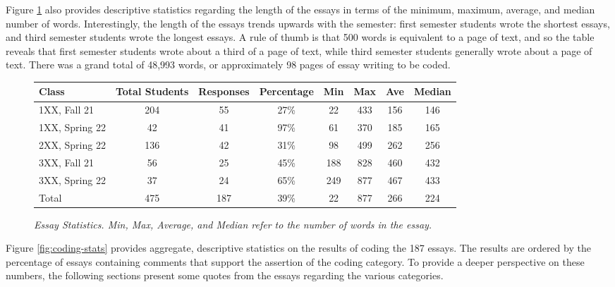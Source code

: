 \documentclass[acmsmall,nonacm]{acmart}
\begin{document}
Figure \ref{fig:essay-stats} also provides descriptive statistics regarding the length of the essays in terms of the minimum, maximum, average, and median number of words. Interestingly, the length of the essays trends upwards with the semester: first semester students wrote the shortest essays, and third semester students wrote the longest essays.  A rule of thumb is that 500 words is equivalent to a page of text, and so the table reveals that first semester students wrote about a third of a page of text, while third semester students generally wrote about a page of text. There was a grand total of 48,993 words, or approximately 98 pages of essay writing to be coded.

\begin{figure}[th]
\centering
\small
\begin{tabular}{ l c c c | c c c c}
\hline
 Class & Total Students & Responses & Percentage & Min & Max & Ave & Median \\
\hline
 1XX, Fall 21 & 204 & 55 & 27\% & 22 & 433 & 156 & 146\\
 1XX, Spring 22 & 42 & 41 & 97\% & 61 & 370 & 185 & 165\\
 2XX, Spring 22 & 136 & 42 & 31\% & 98 & 499 & 262 & 256\\
 3XX, Fall 21 & 56 & 25 & 45\% & 188 & 828 & 460 & 432\\
 3XX, Spring 22 & 37 & 24 & 65\% & 249 & 877 & 467 & 433\\
\hline
Total & 475 & 187 & 39\% & 22 & 877 & 266 & 224\\
\hline
\end{tabular}
\caption{\em Essay Statistics. Min, Max, Average, and Median refer to the number of words in the essay.}
\normalsize
\label{fig:essay-stats}
\end{figure}

Figure \ref{fig:coding-stats} provides aggregate, descriptive statistics on the results of coding the 187 essays. The results are ordered by the percentage of essays containing comments that support the assertion of the coding category. To provide a deeper perspective on these numbers, the following sections present some quotes from the essays regarding the various categories.
\end{document}
